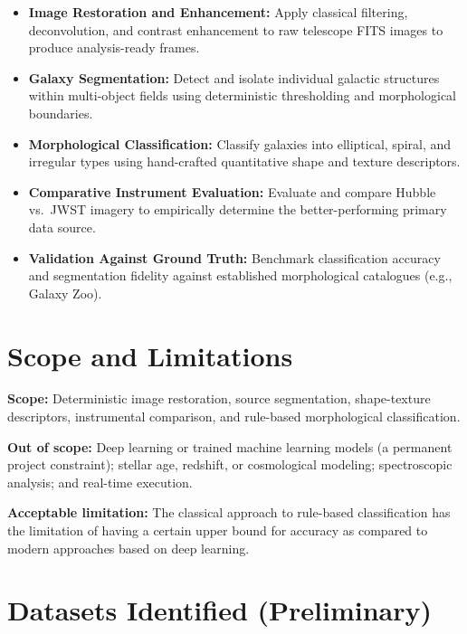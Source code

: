 \documentclass[11pt]{article}
\begin{document}
\begin{itemize}
    \item \textbf{Image Restoration and Enhancement:} Apply classical filtering, deconvolution,
    and contrast enhancement to raw telescope FITS images to produce analysis-ready frames.
    \item \textbf{Galaxy Segmentation:} Detect and isolate individual galactic structures
    within multi-object fields using deterministic thresholding and morphological boundaries.
    \item \textbf{Morphological Classification:} Classify galaxies into elliptical, spiral,
    and irregular types using hand-crafted quantitative shape and texture descriptors.
    \item \textbf{Comparative Instrument Evaluation:} Evaluate and compare Hubble vs.\ JWST
    imagery to empirically determine the better-performing primary data source.
    \item \textbf{Validation Against Ground Truth:} Benchmark classification accuracy and
    segmentation fidelity against established morphological catalogues (e.g., Galaxy Zoo).
\end{itemize}


\section{Scope and Limitations}

\textbf{Scope:} Deterministic image restoration, source segmentation, shape-texture descriptors, instrumental comparison, and rule-based morphological classification.

\textbf{Out of scope:} Deep learning or trained machine learning models (a permanent project constraint); stellar age, redshift, or cosmological modeling; spectroscopic analysis; and real-time execution.

\textbf{Acceptable limitation:} The classical approach to rule-based classification has the limitation of having a certain upper bound for accuracy as compared to modern approaches based on deep learning.


\section{Datasets Identified (Preliminary)}
\end{document}
